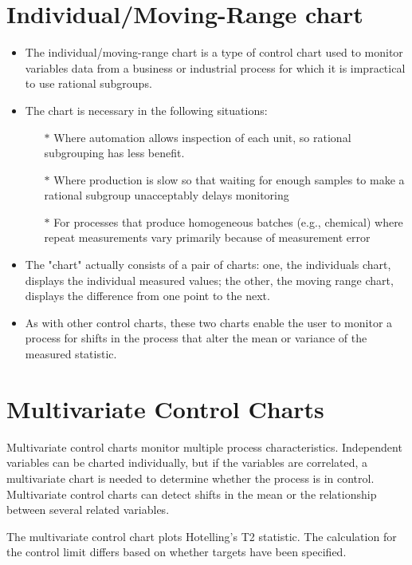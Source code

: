 \documentclass[a4paper,12pt]{article}
\begin{document}
\section{Individual/Moving-Range chart}
\begin{itemize}
\item The individual/moving-range chart is a type of control chart used to monitor variables data from a business or industrial process for which it is impractical to use rational subgroups.

\item The chart is necessary in the following situations:
\begin{itemize}
\item[$\ast$] Where automation allows inspection of each unit, so rational subgrouping has less benefit.
\item[$\ast$]Where production is slow so that waiting for enough samples to make a rational subgroup unacceptably delays monitoring
\item[$\ast$] For processes that produce homogeneous batches (e.g., chemical) where repeat measurements vary primarily because of measurement error
\end{itemize}
\item The "chart" actually consists of a pair of charts: one, the individuals chart, displays the individual measured values; the other, the moving range chart, displays the difference from one point to the next. 
\item As with other control charts, these two charts enable the user to monitor a process for shifts in the process that alter the mean or variance of the measured statistic.
\end{itemize}
\newpage
\section{Multivariate Control Charts}
Multivariate control charts monitor multiple process characteristics. Independent variables can be charted individually, but if the variables are correlated, a multivariate chart is needed to determine whether the process is in control. Multivariate control charts can detect shifts in the mean or the relationship between several related variables.

The multivariate control chart plots Hotelling’s T2 statistic. The calculation for the control limit differs based on whether targets have been specified.
\newpage
\end{document}
